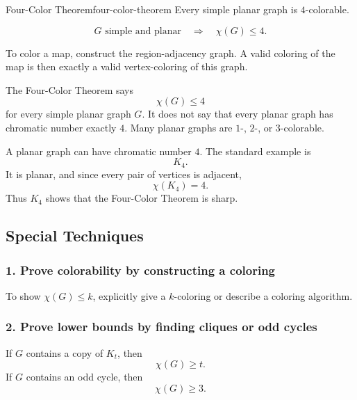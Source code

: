 \begin{theorem}{Four-Color Theorem}{four-color-theorem}
Every simple planar graph is \(4\)-colorable.
\end{theorem}

\begin{keyformula}[title={Four-Color Theorem}]
\[
G\text{ simple and planar}
\quad\Longrightarrow\quad
\chi(G)\le 4.
\]
\end{keyformula}

\begin{examplebox}[title={Map coloring as graph coloring}]
To color a map, construct the region-adjacency graph. A valid coloring of the map is then exactly a valid vertex-coloring of this graph.
\end{examplebox}

\begin{commonmistake}[title={Four colors is an upper bound, not always the exact value}]
The Four-Color Theorem says
\[
\chi(G)\le 4
\]
for every simple planar graph \(G\). It does not say that every planar graph has chromatic number exactly \(4\). Many planar graphs are \(1\)-, \(2\)-, or \(3\)-colorable.
\end{commonmistake}

\begin{examplebox}[title={Tutorial 9, Question 6}]
A planar graph can have chromatic number \(4\). The standard example is
\[
K_4.
\]
It is planar, and since every pair of vertices is adjacent,
\[
\chi(K_4)=4.
\]
Thus \(K_4\) shows that the Four-Color Theorem is sharp.
\end{examplebox}

\subsection{Special Techniques}

\subsubsection*{1. Prove colorability by constructing a coloring}
To show \(\chi(G)\le k\), explicitly give a \(k\)-coloring or describe a coloring algorithm.

\subsubsection*{2. Prove lower bounds by finding cliques or odd cycles}
If \(G\) contains a copy of \(K_t\), then
\[
\chi(G)\ge t.
\]
If \(G\) contains an odd cycle, then
\[
\chi(G)\ge 3.
\]

